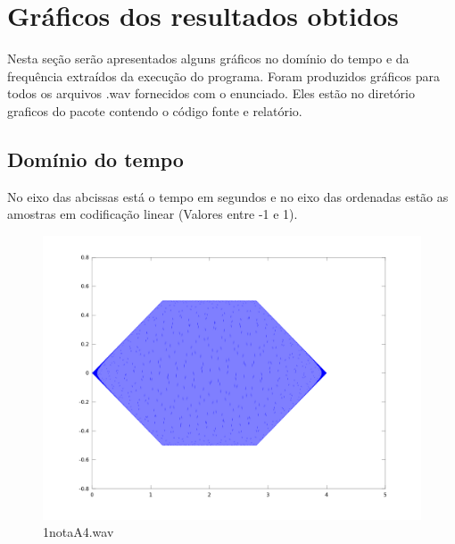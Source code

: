 \documentclass[brazil,times]{abnt}
\begin{document}
\chapter{Gráficos dos resultados obtidos}
	Nesta seção serão apresentados alguns gráficos no domínio do tempo e da frequência extraídos da execução do programa. Foram produzidos gráficos para todos os arquivos .wav fornecidos com o enunciado. Eles estão no diretório graficos do pacote contendo o código fonte e relatório.

	\section{Domínio do tempo}
		No eixo das abcissas está o tempo em segundos e no eixo das ordenadas estão as amostras em codificação linear (Valores entre -1 e 1).
			\begin{figure}[h!]
			\begin{center}
			  \includegraphics[width=150mm]{imagens/1notaA4_tempo.png}
			  \caption[1notaA4.wav]{1notaA4.wav}
			\end{center}
			\end{figure}
\end{document}
